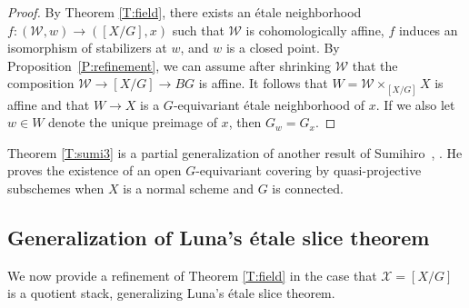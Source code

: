 \documentclass[a4paper]{amsart}
\theoremstyle{plain}
\theoremstyle{definition}
\theoremstyle{remark}
\numberwithin{equation}{section}
\newcommand\cW{\mathcal{W}}
\newcommand\cX{\mathcal{X}}
\begin{document}
\begin{proof}%
By Theorem \ref{T:field}, there exists an \'etale neighborhood $f\colon (\cW,w) \to 
([X/G],x)$ such that $\cW$ is cohomologically affine, $f$ induces an isomorphism of 
stabilizers at $w$, and $w$ is a closed point.  By
Proposition~\ref{P:refinement}, we can assume after shrinking $\cW$ that 
the composition $\cW \to [X/G] \to BG$ is affine.  It follows that $W = \cW \times_{[X/G]} X$ is affine and that 
$W \to X$ is a $G$-equivariant \'etale neighborhood of $x$. If we also let
$w\in W$ denote the unique preimage of $x$, then $G_w=G_x$.
\end{proof}


Theorem \ref{T:sumi3} is a partial generalization of another result of
Sumihiro~\cite[Lem.~8]{sumihiro}, \cite[Thm.~3.8]{sumihiro2}. He proves
the existence of an open $G$-equivariant covering by quasi-projective
subschemes when $X$ is a normal scheme and $G$ is connected.


\subsection{Generalization of Luna's \'etale slice theorem} \label{A:luna}

We now provide a refinement of Theorem \ref{T:field} in the case that $\cX = [X/G]$ is a quotient stack, generalizing Luna's \'etale slice theorem. 
\end{document}
